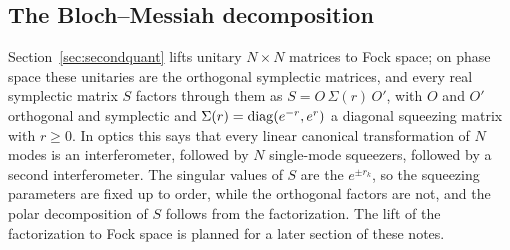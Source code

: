 \providecommand{\cU}{\mathcal U}
\providecommand{\cV}{\mathcal V}
\providecommand{\Sp}{\mathrm{Sp}(2N,\R)}
\providecommand{\Or}{\mathrm{O}(2N)}
\providecommand{\Un}{\mathrm{U}(N)}
\providecommand{\SpO}{\mathrm{Sp}(2N,\R)\cap\mathrm{O}(2N)}
\providecommand{\spn}{\operatorname{span}}
\begin{vetdenv}
\section{The Bloch--Messiah decomposition}\label{sec:blochmessiah}

Section~\ref{sec:secondquant} lifts unitary $N\times N$ matrices to Fock space; on phase space these unitaries are the
orthogonal symplectic matrices, and every real symplectic matrix $S$ factors through them as $S=O\,\Sigma(r)\,O'$,
with $O$ and $O'$ orthogonal and symplectic and $\Sigma(r)=\operatorname{diag}(e^{-r},e^{r})$ a diagonal squeezing matrix with
$r\ge0$. In optics this says that every linear canonical transformation of $N$ modes is an interferometer, followed by
$N$ single-mode squeezers, followed by a second interferometer. The singular values of $S$ are the $e^{\pm r_k}$, so the
squeezing parameters are fixed up to order, while the orthogonal factors are not, and the polar decomposition of $S$
follows from the factorization. The lift of the factorization to Fock space is planned for a later section of these notes.


\end{vetdenv}
